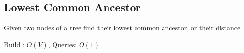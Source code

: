 \subsection{Lowest Common Ancestor}

Given two nodes of a tree find their lowest common ancestor, or their distance

Build : $O(V)$, Queries: $O(1)$
